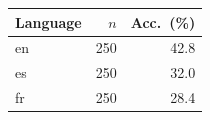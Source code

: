 \begin{tabular}{lrr}
\toprule
Language & $n$ & Acc.\ (\%) \\
\midrule
en & 250 & 42.8 \\
es & 250 & 32.0 \\
fr & 250 & 28.4 \\
\bottomrule
\end{tabular}
